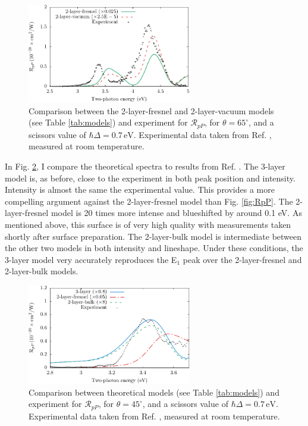 \begin{figure}[t]
\centering 
\includegraphics[width=0.64\textwidth]
{content/figures/fig-Si1x1-Mejia_RpP_models}
\caption[2-layer-fresnel and 2-layer vacuum for $\mathcal{R}_{pP}$.]
{Comparison between the 2-layer-fresnel and 2-layer-vacuum models (see Table
\ref{tab:models}) and experiment for $\mathcal{R}_{pP}$, for
$\theta=65^{\circ}$, and a scissors value of $\hbar\Delta = 0.7\,\text{eV}$.
Experimental data taken from Ref. \cite{mejiaPRB02}, measured at room
temperature.}
\label{fig:othermodels}
\end{figure}

In Fig. \ref{fig:mitchellRpP}, I compare the theoretical spectra to results from
Ref. \cite{mitchellSS01}. The 3-layer model is, as before, close to the
experiment in both peak position and intensity. Intensity is almost the same the
experimental value. This provides a more compelling argument against the
2-layer-fresnel model than Fig. \ref{fig:RpP}. The 2-layer-fresnel model is 20
times more intense and blueshifted by around 0.1 eV. As mentioned above, this
surface is of very high quality with measurements taken shortly after surface
preparation. The 2-layer-bulk model is intermediate between the other two models
in both intensity and lineshape. Under these conditions, the 3-layer model very
accurately reproduces the E$_{1}$ peak over the 2-layer-fresnel and 2-layer-bulk
models.

\begin{figure}[t]
\centering
\includegraphics[width=0.64\textwidth]{content/figures/fig-Si1x1-Mitchell_RpP}
\caption[$\mathcal{R}_{pP}$ compared to experimental data from Mitchell et al.]
{Comparison between theoretical models (see Table \ref{tab:models}) and
experiment for $\mathcal{R}_{pP}$, for $\theta=45^{\circ}$, and a scissors value
of $\hbar\Delta = 0.7\,\text{eV}$. Experimental data taken from Ref.
\cite{mitchellSS01}, measured at room temperature.}
\label{fig:mitchellRpP}
\end{figure}


